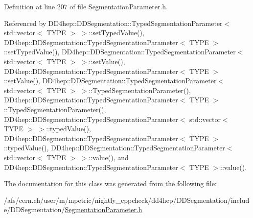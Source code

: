 Definition at line 207 of file SegmentationParameter.h.

Referenced by DD4hep::DDSegmentation::TypedSegmentationParameter$<$ std::vector$<$ TYPE $>$ $>$::setTypedValue(), DD4hep::DDSegmentation::TypedSegmentationParameter$<$ TYPE $>$::setTypedValue(), DD4hep::DDSegmentation::TypedSegmentationParameter$<$ std::vector$<$ TYPE $>$ $>$::setValue(), DD4hep::DDSegmentation::TypedSegmentationParameter$<$ TYPE $>$::setValue(), DD4hep::DDSegmentation::TypedSegmentationParameter$<$ std::vector$<$ TYPE $>$ $>$::TypedSegmentationParameter(), DD4hep::DDSegmentation::TypedSegmentationParameter$<$ TYPE $>$::TypedSegmentationParameter(), DD4hep::DDSegmentation::TypedSegmentationParameter$<$ std::vector$<$ TYPE $>$ $>$::typedValue(), DD4hep::DDSegmentation::TypedSegmentationParameter$<$ TYPE $>$::typedValue(), DD4hep::DDSegmentation::TypedSegmentationParameter$<$ std::vector$<$ TYPE $>$ $>$::value(), and DD4hep::DDSegmentation::TypedSegmentationParameter$<$ TYPE $>$::value().

The documentation for this class was generated from the following file:\begin{DoxyCompactItemize}
\item 
/afs/cern.ch/user/m/mpetric/nightly\_\-cppcheck/dd4hep/DDSegmentation/include/DDSegmentation/\hyperlink{_segmentation_parameter_8h}{SegmentationParameter.h}\end{DoxyCompactItemize}

